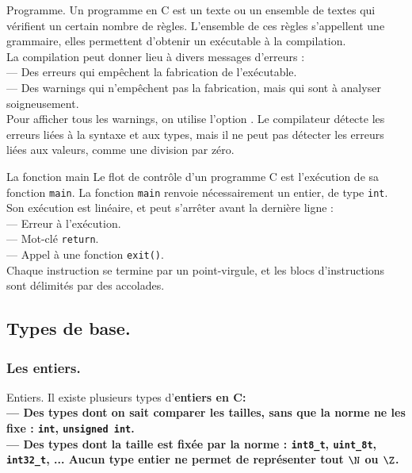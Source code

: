 \documentclass[french, 11pt]{article}
\begin{document}
\begin{defi}{Programme.}{}
    Un programme en C est un texte ou un ensemble de textes qui vérifient un certain nombre de règles.
    L'ensemble de ces règles s'appellent une grammaire, elles permettent d'obtenir un exécutable à la compilation.\\
    La compilation peut donner lieu à divers messages d'erreurs :\\
    --- Des erreurs qui empêchent la fabrication de l'exécutable.\\
    --- Des warnings qui n'empêchent pas la fabrication, mais qui sont à analyser soigneusement.\\
    Pour afficher tous les warnings, on utilise l'option .\n
    Le compilateur détecte les erreurs liées à la syntaxe et aux types, mais il ne peut pas détecter les erreurs liées aux valeurs, comme une division par zéro.
\end{defi}

\begin{defi}{La fonction main}{}
    Le flot de contrôle d'un programme C est l'exécution de sa fonction \texttt{main}.\n
    La fonction \texttt{main} renvoie nécessairement un entier, de type \texttt{int}. Son exécution est linéaire, et peut s'arrêter avant la dernière ligne :\\
    --- Erreur à l'exécution.\\
    --- Mot-clé \texttt{return}.\\
    --- Appel à une fonction \texttt{exit()}.\\
    Chaque instruction se termine par un point-virgule, et les blocs d'instructions sont délimités par des accolades.
\end{defi}

\subsection{Types de base.}

\subsubsection{Les entiers.}

\begin{defi}{Entiers.}{}
    Il existe plusieurs types d'\bf{entiers} en C:\\
    --- Des types dont on sait comparer les tailles, sans que la norme ne les fixe : \texttt{int}, \texttt{unsigned int}.\\
    --- Des types dont la taille est fixée par la norme : \texttt{int8\_t}, \texttt{uint\_8t}, \texttt{int32\_t}, ...\n
    Aucun type entier ne permet de représenter tout $\N$ ou $\Z$.
\end{defi}
\end{document}
